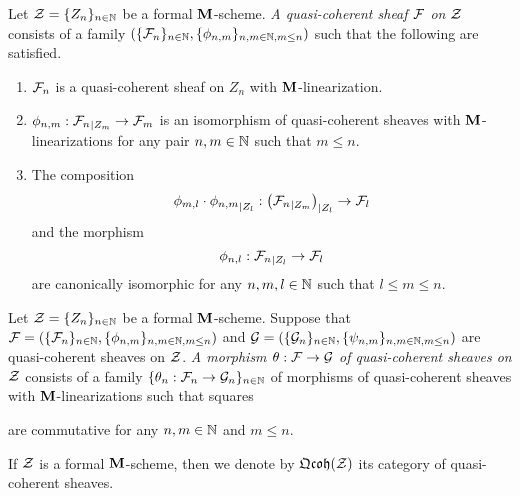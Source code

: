 \begin{definition}
Let ${\mathcal Z} = \{Z_n\}_{n\in \mathbb{N}}$ be a formal $\mathbf{M}$-scheme. \textit{A quasi-coherent sheaf ${\mathcal F}$ on ${\mathcal Z}$} consists of a family $\left(\{{\mathcal F}_n\}_{n\in {\mathbb N}},\{\phi_{n,m}\}_{n,m\in {\mathbb N},m\leq n}\right)$ such that the following are satisfied.
\begin{enumerate}[label=\textbf{(\arabic*)}, leftmargin=1.5em]
\item ${\mathcal F}_n$ is a quasi-coherent sheaf on $Z_n$ with $\mathbf{M}$-linearization.
\item $\phi_{n,m}:{{\mathcal F}_n}_{\mid Z_m} \rightarrow {\mathcal F}_m$ is an isomorphism of quasi-coherent sheaves with $\mathbf{M}$-linearizations for any pair $n,m\in {\mathbb N}$ such that $m\leq n$.
\item The composition
$$\phi_{m,l}\cdot {\phi_{n,m}}_{\mid Z_l}:\left({{\mathcal F}_n}_{\mid Z_m}\right)_{\mid Z_l}\rightarrow {\mathcal F}_l$$
and the morphism
$$\phi_{n,l}:{{\mathcal F}_n}_{\mid Z_l}\rightarrow {\mathcal F}_l$$ are canonically isomorphic for any $n,m,l\in {\mathbb N}$ such that $l\leq m\leq n$. 
\end{enumerate}
\end{definition}

\begin{definition}
Let ${\mathcal Z} = \{Z_n\}_{n\in \mathbb{N}}$ be a formal $\mathbf{M}$-scheme. Suppose that ${\mathcal F} = \left(\{{\mathcal F}_n\}_{n\in {\mathbb N}},\{\phi_{n,m}\}_{n,m\in {\mathbb N},m\leq n}\right)$ and ${\mathcal G} = \left(\{{\mathcal G}_n\}_{n\in {\mathbb N}},\{\psi_{n,m}\}_{n,m\in {\mathbb N},m\leq n}\right)$ are quasi-coherent sheaves on ${\mathcal Z}$. \textit{A morphism $\theta:{\mathcal F}\rightarrow {\mathcal G}$ of quasi-coherent sheaves on ${\mathcal Z}$} consists of a family $\{\theta_n:{\mathcal F}_n\rightarrow {\mathcal G}_n\}_{n\in \mathbb{N}}$ of morphisms of quasi-coherent sheaves with $\mathbf{M}$-linearizations such that squares
\begin{center}
\end{center}
are commutative for any $n,m\in {\mathbb N}$ and $m\leq n$.
\end{definition}
\noindent
If ${\mathcal Z}$ is a formal $\mathbf{M}$-scheme, then we denote by $\mathfrak{Qcoh}({\mathcal Z})$ its category of quasi-coherent sheaves.

